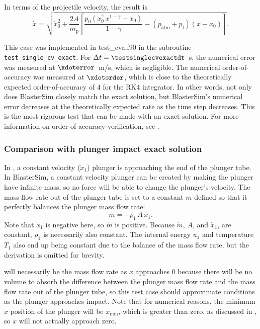 In terms of the projectile velocity, the result is
\begin{equation}
    \dot{x} = \sqrt{\dot{x}_0^2 + \frac{2 A}{m_\text{p}} \left[\frac{p_0 \left(x_0^\gamma\,x^{1-\gamma} - x_0\right)}{1 - \gamma} - (p_\text{atm} + p_\text{f}) (x - x_0)\right]}.
\end{equation}


This case was implemented in test\_cva.f90 in the subroutine \texttt{test\_single\_cv\_exact}. For $\Delta t = \testsinglecvexactdt$~s, the numerical error was measured at $\xdoterror$~m/s, which is negligible. The numerical order-of-accuracy was measured at $\xdotorder$, which is close to the theoretically expected order-of-accuracy of $4$ for the RK4 integrator. In other words, not only does BlasterSim closely match the exact solution, but BlasterSim's numerical error decreases at the theoretically expected rate as the time step decreases. This is the most rigorous test that can be made with an exact solution. For more information on order-of-accuracy verification, see \citet[\S~2.3]{roy_review_2005}.

\subsubsection{Comparison with plunger impact exact solution}\label{plunger-impact-exact}



In , a constant velocity ($\dot{x}_1$) plunger is approaching the end of the plunger tube.
In BlasterSim, a constant velocity plunger can be created by making the plunger have infinite mass, so no force will be able to change the plunger's velocity.
The mass flow rate out of the plunger tube is set to a constant $\dot{m}$ defined so that it perfectly balances the plunger mass flow rate:
\begin{equation}
    \dot{m} = -\rho_1\,A\,\dot{x}_1. \label{eq:plunger impact exact mass flow rate}
\end{equation}
Note that $\dot{x}_1$ is negative here, so $\dot{m}$ is positive.
Because $\dot{m}$, $A$, and $\dot{x}_1$, are constant, $\rho_1$ is necessarily also constant.
The internal energy $u_1$ and temperature $T_1$ also end up being constant due to the balance of the mass flow rate, but the derivation is omitted for brevity.

 will necessarily be the mass flow rate as $x$ approaches 0 because there will be no volume to absorb the difference between the plunger mass flow rate and the mass flow rate out of the plunger tube, so this test case should approximate conditions as the plunger approaches impact.
Note that for numerical reasons, the minimum $x$ position of the plunger will be $x_\text{min}$, which is greater than zero, as discussed in , so $x$ will not actually approach zero.


